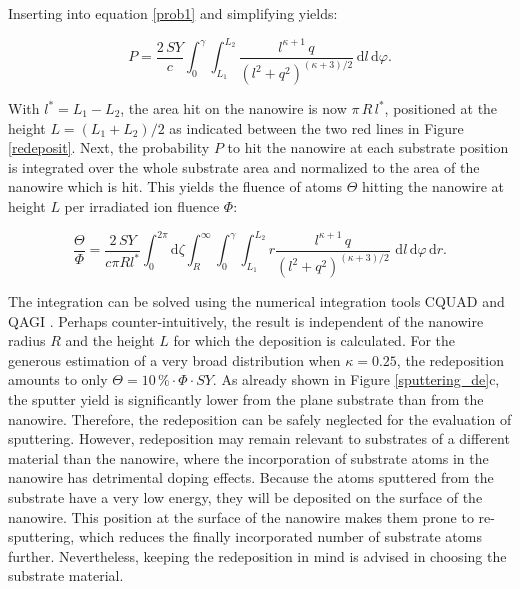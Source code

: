 Inserting into equation \ref{prob1} and simplifying yields:

\begin{equation}
\label{prob2}
P = \frac{2\,SY}{c} \int_0^{\gamma} \! \int_{L_1}^{L_2} \!  \frac{l^{\kappa+1}\,q}{(l^2 + q^2)^{(\kappa + 3)/2}} \,\mathrm{d}l \, \mathrm{d}\varphi.
\end{equation}

With $l^*=L_1-L_2$, the area hit on the nanowire is now $\pi \, R \, l^*$, positioned at the height $L= (L_1+L_2)/2$ as indicated between the two red lines in Figure \ref{redeposit}. Next, the probability $P$ to hit the nanowire at each substrate position is integrated over the whole substrate area and normalized to the area of the nanowire which is hit. This yields the fluence of atoms $\Theta$ hitting the nanowire at height $L$ per irradiated ion fluence $\Phi$:

\begin{equation}
\label{prob3}
\frac{\Theta}{\Phi} = \frac{2\,SY}{c \pi Rl^*} \int_0^{2\pi}\! \mathrm{d}\zeta \int_R^{\infty} \!
\int_0^{\gamma} \! \int_{L_1}^{L_2} \! r \frac{l^{\kappa+1}\,q}{(l^2 + q^2)^{(\kappa + 3)/2}}\,\,\mathrm{d}l \, \mathrm{d}\varphi\,\mathrm{d}r.
\end{equation}

The integration can be solved using the numerical integration tools CQUAD and QAGI \cite{gough_gnu_2009}. Perhaps counter-intuitively, the result is independent of the nanowire radius $R$ and the height $L$ for which the deposition is calculated. For the generous estimation of a very broad distribution when $\kappa = 0.25$, the redeposition amounts to only $\Theta =10\,\% \cdot \Phi\cdot SY$. As already shown in Figure \ref{sputtering_de}c, the sputter yield is significantly lower from the plane substrate than from the nanowire. Therefore, the redeposition can be safely neglected for the evaluation of sputtering. However, redeposition may remain relevant to substrates of a different material than the nanowire, where the incorporation of substrate atoms in the nanowire has detrimental doping effects. Because the atoms sputtered from the substrate have a very low energy, they will be deposited on the surface of the nanowire. This position at the surface of the nanowire makes them prone to re-sputtering, which reduces the finally incorporated number of substrate atoms further. Nevertheless, keeping the redeposition in mind is advised in choosing the substrate material.






